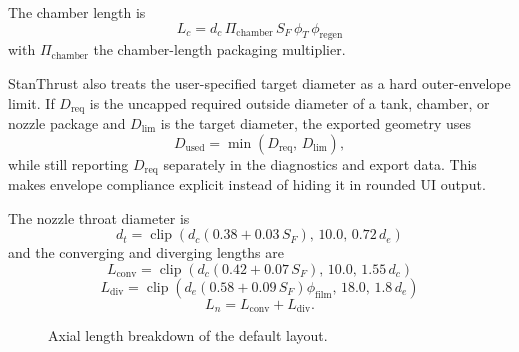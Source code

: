 \documentclass[11pt]{article}
\newcommand{\clip}{\operatorname{clip}}
\begin{document}
The chamber length is
\begin{equation}
L_c
=
d_c\,
\Pi_{\text{chamber}}\,
S_F\,
\phi_T\,
\phi_{\text{regen}}
\label{eq:chamber-length}
\end{equation}
with $\Pi_{\text{chamber}}$ the chamber-length packaging multiplier.

StanThrust also treats the user-specified target diameter as a hard outer-envelope limit. If $D_{\text{req}}$ is the uncapped required outside diameter of a tank, chamber, or nozzle package and $D_{\text{lim}}$ is the target diameter, the exported geometry uses
\begin{equation}
D_{\text{used}}=\min\!\left(D_{\text{req}},\,D_{\text{lim}}\right),
\label{eq:diameter-cap}
\end{equation}
while still reporting $D_{\text{req}}$ separately in the diagnostics and export data. This makes envelope compliance explicit instead of hiding it in rounded UI output.

The nozzle throat diameter is
\begin{equation}
d_t
=
\clip\!\left(
d_c\left(0.38+0.03\,S_F\right),\,
10.0,\,
0.72\,d_e
\right)
\label{eq:throat-diameter}
\end{equation}
and the converging and diverging lengths are
\begin{equation}
L_{\text{conv}}
=
\clip\!\left(
d_c\left(0.42+0.07\,S_F\right),\,
10.0,\,
1.55\,d_c
\right)
\label{eq:lconv}
\end{equation}
\begin{equation}
L_{\text{div}}
=
\clip\!\left(
d_e\left(0.58+0.09\,S_F\right)\phi_{\text{film}},\,
18.0,\,
1.8\,d_e
\right)
\label{eq:ldiv}
\end{equation}
\begin{equation}
L_n = L_{\text{conv}} + L_{\text{div}}.
\label{eq:nozzle-length}
\end{equation}

\begin{figure}[H]
\centering
{}
\caption{Axial length breakdown of the default layout.}
\end{figure}
\end{document}
